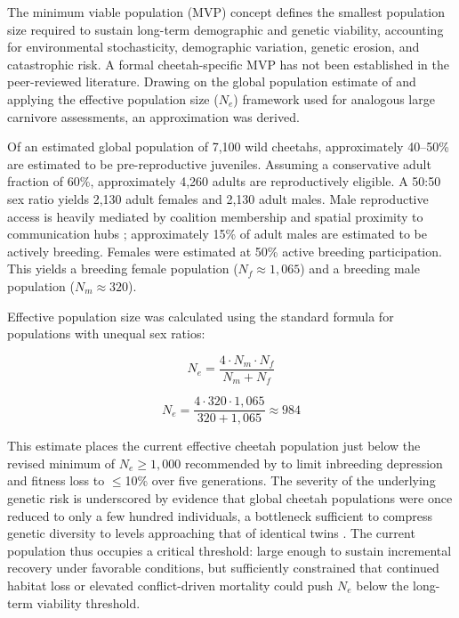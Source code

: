 \documentclass[12pt, letterpaper]{article}
\begin{document}
The minimum viable population (MVP) concept defines the smallest population size required to
sustain long-term demographic and genetic viability, accounting for environmental stochasticity,
demographic variation, genetic erosion, and catastrophic risk. A formal cheetah-specific MVP
has not been established in the peer-reviewed literature. Drawing on the global population
estimate of \citet{Durant2017} and applying the effective population size ($N_e$) framework
used for analogous large carnivore assessments, an approximation was derived.

Of an estimated global population of 7,100 wild cheetahs, approximately 40--50\% are
estimated to be pre-reproductive juveniles. Assuming a conservative adult fraction of 60\%,
approximately 4,260 adults are reproductively eligible. A 50:50 sex ratio yields 2,130 adult
females and 2,130 adult males. Male reproductive access is heavily mediated by coalition
membership and spatial proximity to communication hubs \citep{Melzheimer2020};
approximately 15\% of adult males are estimated to be actively breeding. Females were
estimated at 50\% active breeding participation. This yields a breeding female population
($N_f \approx 1{,}065$) and a breeding male population ($N_m \approx 320$).

Effective population size was calculated using the standard formula for populations with
unequal sex ratios:

\begin{equation}
  N_e = \frac{4 \cdot N_m \cdot N_f}{N_m + N_f}
\end{equation}

\begin{equation}
  N_e = \frac{4 \cdot 320 \cdot 1{,}065}{320 + 1{,}065} \approx 984
\end{equation}

This estimate places the current effective cheetah population just below the revised minimum of
$N_e \geq 1{,}000$ recommended by \citet{Frankham2014} to limit inbreeding depression and
fitness loss to $\leq$10\% over five generations. The severity of the underlying genetic risk is
underscored by evidence that global cheetah populations were once reduced to only a few
hundred individuals, a bottleneck sufficient to compress genetic diversity to levels approaching
that of identical twins \citep{Durant2017}. The current population thus occupies a critical
threshold: large enough to sustain incremental recovery under favorable conditions, but
sufficiently constrained that continued habitat loss or elevated conflict-driven mortality could
push $N_e$ below the long-term viability threshold.
\end{document}

